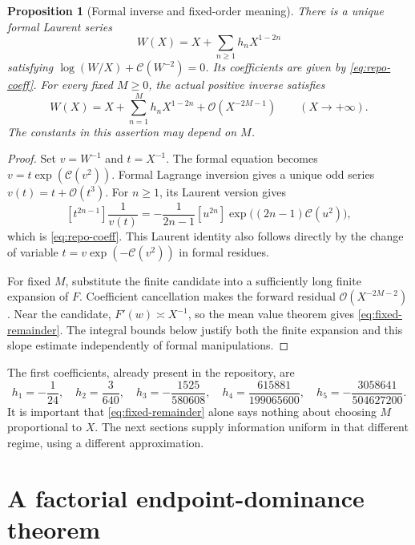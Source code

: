 \documentclass[11pt,a4paper]{article}
\newtheorem{proposition}[theorem]{Proposition}
\theoremstyle{definition}
\numberwithin{equation}{section}
\newcommand{\coef}[2]{[#1^{#2}]}
\newcommand{\Oh}{\mathcal O}
\newcommand{\cformal}{\mathscr C}
\begin{document}
\begin{proposition}[Formal inverse and fixed-order meaning]
\label{prop:formal}
There is a unique formal Laurent series
\begin{equation}
 W(X)=X+\sum_{n\ge1}h_nX^{1-2n}
 \label{eq:wformal}
\end{equation}
satisfying $\log(W/X)+\cformal(W^{-2})=0$. Its coefficients are given by \eqref{eq:repo-coeff}. For every fixed $M\ge0$, the actual positive inverse satisfies
\begin{equation}
 W(X)=X+\sum_{n=1}^{M}h_nX^{1-2n}+\Oh(X^{-2M-1})
 \qquad (X\to+\infty).
 \label{eq:fixed-remainder}
\end{equation}
The constants in this assertion may depend on $M$.
\end{proposition}
\begin{proof}
Set $v=W^{-1}$ and $t=X^{-1}$. The formal equation becomes
$v=t\exp(\cformal(v^2))$. Formal Lagrange inversion gives a unique odd series $v(t)=t+\Oh(t^3)$. For $n\ge1$, its Laurent version gives
\[
 \coef{t}{2n-1}\frac1{v(t)}
 =-\frac1{2n-1}\coef{u}{2n}
       \exp\bigl((2n-1)\cformal(u^2)\bigr),
\]
which is \eqref{eq:repo-coeff}. This Laurent identity also follows directly by the change of variable $t=v\exp(-\cformal(v^2))$ in formal residues.

For fixed $M$, substitute the finite candidate into a sufficiently long finite expansion of $F$. Coefficient cancellation makes the forward residual $\Oh(X^{-2M-2})$. Near the candidate, $F'(w)\asymp X^{-1}$, so the mean value theorem gives \eqref{eq:fixed-remainder}. The integral bounds below justify both the finite expansion and this slope estimate independently of formal manipulations.
\end{proof}

The first coefficients, already present in the repository, are
\begin{equation}
 h_1=-\frac1{24},\quad h_2=\frac3{640},\quad
 h_3=-\frac{1525}{580608},\quad
 h_4=\frac{615881}{199065600},\quad
 h_5=-\frac{3058641}{504627200}.
 \label{eq:h-first}
\end{equation}
It is important that \eqref{eq:fixed-remainder} alone says nothing about choosing $M$ proportional to $X$. The next sections supply information uniform in that different regime, using a different approximation.

\section{A factorial endpoint-dominance theorem}
\label{sec:endpoint}
\end{document}
